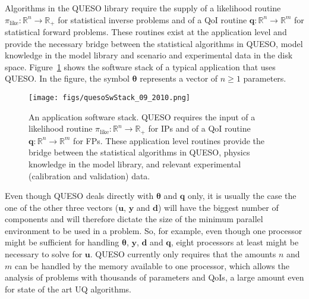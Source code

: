 Algorithms in the QUESO library require the supply
of a likelihood routine $\pi_{\text{like}}:\mathbb{R}^n\rightarrow\mathbb{R}_+$ for statistical inverse problems and 
of a QoI routine $\mathbf{q}:\mathbb{R}^n\rightarrow\mathbb{R}^m$ for statistical forward problems. These routines
exist at the application level and provide the necessary bridge between the statistical algorithms in QUESO,
model knowledge in the model library and scenario and experimental data in the disk space.
%
Figure~\ref{fig-sw-stack} shows the software stack of a typical application that uses QUESO. In the figure, the symbol $\boldsymbol{\theta}$ represents a vector of $n\geqslant 1$ parameters. 
%
\begin{figure}[!htbp]
\centerline{
\texttt{[image: figs/quesoSwStack\_09\_2010.png]}
}
\caption{
An application software stack.
QUESO requires the input
of a likelihood routine $\pi_{\text{like}}:\mathbb{R}^n\rightarrow\mathbb{R}_+$ for IPs and 
of a QoI routine $\mathbf{q}:\mathbb{R}^n\rightarrow\mathbb{R}^m$ for FPs.
These application level routines provide the bridge between
the statistical algorithms in QUESO,
physics 
knowledge in the model library, and relevant 
experimental (calibration
    and validation) data.
}
\label{fig-sw-stack}
\end{figure}

%
Even though QUESO deals directly with $\boldsymbol{\theta}$ and $\mathbf{q}$ only,
it is usually the case the one of the other three vectors ($\mathbf{u}$, $\mathbf{y}$ and $\mathbf{d}$) will have the biggest number of components and will therefore
dictate the size of the minimum parallel environment to be used in a problem.
%
So, for example, even though one processor might be sufficient for handling $\boldsymbol{\theta}$, $\mathbf{y}$, $\mathbf{d}$ and $\mathbf{q}$,
eight processors at least might be necessary to solve for $\mathbf{u}$.
QUESO currently only requires that the amounts $n$ and $m$ can be handled by the memory available to one processor,
which allows the analysis of problems with thousands of parameters and QoIs, a large amount even for state of the art UQ algorithms.

